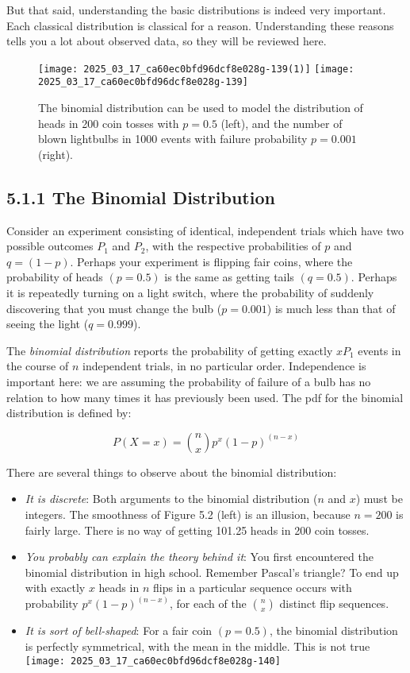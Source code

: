 \documentclass[10pt]{article}
\begin{document}
But that said, understanding the basic distributions is indeed very important. Each classical distribution is classical for a reason. Understanding these reasons tells you a lot about observed data, so they will be reviewed here.

\begin{figure}[h]
\centering
\texttt{[image: 2025\_03\_17\_ca60ec0bfd96dcf8e028g-139(1)]}
\texttt{[image: 2025\_03\_17\_ca60ec0bfd96dcf8e028g-139]}
\caption{The binomial distribution can be used to model the distribution of heads in 200 coin tosses with $p=0.5$ (left), and the number of blown lightbulbs in 1000 events with failure probability $p=0.001$ (right).}
\end{figure}

\subsection*{5.1.1 The Binomial Distribution}
Consider an experiment consisting of identical, independent trials which have two possible outcomes $P_{1}$ and $P_{2}$, with the respective probabilities of $p$ and $q=(1-p)$. Perhaps your experiment is flipping fair coins, where the probability of heads $(p=0.5)$ is the same as getting tails $(q=0.5)$. Perhaps it is repeatedly turning on a light switch, where the probability of suddenly discovering that you must change the bulb ($p=0.001$) is much less than that of seeing the light ($q=0.999$).

The \emph{binomial distribution} reports the probability of getting exactly $x P_{1}$ events in the course of $n$ independent trials, in no particular order. Independence is important here: we are assuming the probability of failure of a bulb has no relation to how many times it has previously been used. The pdf for the binomial distribution is defined by:

\[
P(X=x)=\binom{n}{x} p^{x}(1-p)^{(n-x)}
\]

There are several things to observe about the binomial distribution:
\begin{itemize}
  \item \emph{It is discrete}: Both arguments to the binomial distribution ($n$ and $x$) must be integers. The smoothness of Figure 5.2 (left) is an illusion, because $n=200$ is fairly large. There is no way of getting 101.25 heads in 200 coin tosses.
  \item \emph{You probably can explain the theory behind it}: You first encountered the binomial distribution in high school. Remember Pascal's triangle? To end up with exactly $x$ heads in $n$ flips in a particular sequence occurs with probability $p^{x}(1-p)^{(n-x)}$, for each of the $\binom{n}{x}$ distinct flip sequences.
  \item \emph{It is sort of bell-shaped}: For a fair coin $(p=0.5)$, the binomial distribution is perfectly symmetrical, with the mean in the middle. This is not true\\
\texttt{[image: 2025\_03\_17\_ca60ec0bfd96dcf8e028g-140]}
\end{itemize}
\end{document}
